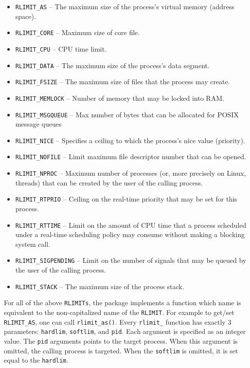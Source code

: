 \documentclass[article]{jss}
\begin{document}
\begin{itemize}
  \item \texttt{RLIMIT\_AS} -- The maximum size of the process's virtual memory
  (address space).
  \item \texttt{RLIMIT\_CORE} -- Maximum size of core file.
  \item \texttt{RLIMIT\_CPU} -- CPU time limit.
  \item \texttt{RLIMIT\_DATA} --  The maximum size of the process's data
  segment.
  \item \texttt{RLIMIT\_FSIZE} --  The maximum size of files that the process
  may create.
  \item \texttt{RLIMIT\_MEMLOCK} -- Number of memory that may be locked into
  RAM.
  \item \texttt{RLIMIT\_MSGQUEUE} -- Max number of bytes that can be allocated
  for POSIX message queues
  \item \texttt{RLIMIT\_NICE} --  Specifies a ceiling to which the process's
  nice value (priority).
  \item \texttt{RLIMIT\_NOFILE} -- Limit maximum file descriptor number that can
  be opened.
  \item \texttt{RLIMIT\_NPROC} -- Maximum number of processes (or, more
  precisely on Linux, threads) that can be created by the user of the calling process.
  \item \texttt{RLIMIT\_RTPRIO} -- Ceiling on the real-time priority that may be
  set for this process.
  \item \texttt{RLIMIT\_RTTIME} -- Limit on the amount of CPU time that a
  process scheduled under a real-time scheduling policy may consume without making a blocking system call.
  \item \texttt{RLIMIT\_SIGPENDING} -- Limit on the number of signals that may
  be queued by the user of the calling process.
  \item \texttt{RLIMIT\_STACK} -- The maximum size of the process stack.
\end{itemize}

For all of the above \texttt{RLIMITs}, the  package implements a
function which name is equivalent to the non-capitalized name of the
\texttt{RLIMIT}. For example to get/set \texttt{RLIMIT\_AS}, one can call
\texttt{rlimit\_as()}. Every \texttt{rlimit\_} function has exactly 3 parameters:
\texttt{hardlim}, \texttt{softlim}, and \texttt{pid}. Each argument is
specified as an integer value. The \texttt{pid} arguments points to the target
process. When this argument is omitted, the calling process is targeted. When
the \texttt{softlim} is omitted, it is set equal to the \texttt{hardlim}.
\end{document}
